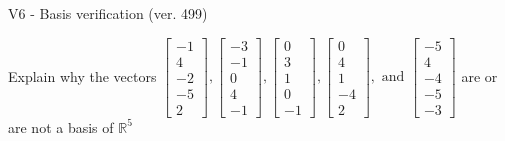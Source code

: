 \begin{exercise}
  \begin{exerciseTitle}V6 - Basis verification (ver. 499)\end{exerciseTitle}
  \begin{exerciseStatement}
    Explain why the vectors \(\left[\begin{array}{r}
-1 \\
4 \\
-2 \\
-5 \\
2
\end{array}\right] , \left[\begin{array}{r}
-3 \\
-1 \\
0 \\
4 \\
-1
\end{array}\right] , \left[\begin{array}{r}
0 \\
3 \\
1 \\
0 \\
-1
\end{array}\right] , \left[\begin{array}{r}
0 \\
4 \\
1 \\
-4 \\
2
\end{array}\right] , \text{ and } \left[\begin{array}{r}
-5 \\
4 \\
-4 \\
-5 \\
-3
\end{array}\right]\) are or are not a basis of \(\mathbb{R}^5\)	



\end{exerciseStatement}
\end{exercise}
